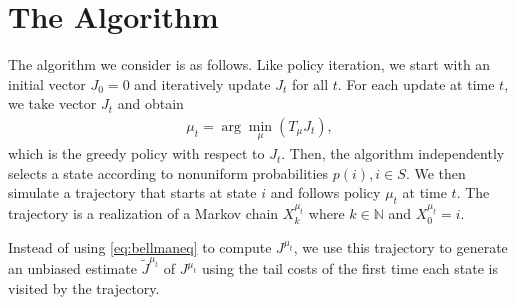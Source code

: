 \documentclass[12pt]{article}
\begin{document}
\section{The Algorithm}\label{TheAlgorithm}


The algorithm we consider is as follows. Like policy iteration, we start with an initial vector $J_0=0$ and iteratively update $J_t$ for all $t$. For each update at time $t$, we take vector $J_t$ and obtain 
\begin{align}
\mu_t = \arg\min_{\mu}(T_\mu J_t), \label{greedypol}
\end{align} which is the greedy policy with respect to $J_t$. Then, the algorithm independently selects a state according to nonuniform probabilities $p(i), i \in S$. We then simulate a trajectory that starts at state $i$ and follows policy $\mu_t$ at time $t$. The trajectory is a realization of a Markov chain $X_k^{\mu_t}$ where $k \in \mathbb{N}$ and $X_0^{\mu_t} = i$.

Instead of using \eqref{eq:bellmaneq} to compute $J^{\mu_t}$, we use this trajectory to generate an unbiased estimate $\tilde{J}^{\mu_t}$ of $J^{\mu_t}$ using the tail costs of the first time each state is visited by the trajectory. 
\end{document}
